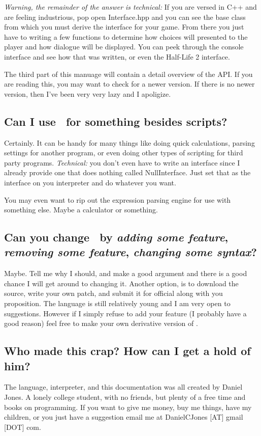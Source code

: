\emph{Warning, the remainder of the answer is technical:} If you are versed in C++ and are feeling industrious, pop open Interface.hpp and you can see the base class from which you must derive the interface for your game.   From there you just have to writing a few functions to determine how choices will presented to the player and how dialogue will be displayed.  You can peek through the console interface and see how that was written, or even the Half-Life 2 interface.

The third part of this manuage will contain a detail overview of the API.  If you are reading this, you may want to check for a newer version.  If there is no newer version, then I've been very very lazy and I apoligize.

\subsection{Can I use \SSquared\ for something besides scripts?}
Certainly.  It can be handy for many things like doing quick calculations, parsing settings for another program, or even doing other types of scripting for third party programs.  \emph{Technical:} you don't even have to write an interface since I already provide one that does nothing called NullInterface.  Just set that as the interface on you interpreter and do whatever you want.

You may even want to rip out the expression parsing engine for use with something else.  Maybe a calculator or something.

\subsection{Can you change \SSquared\ by \emph{adding some feature}, \emph{removing some feature}, \emph{changing some syntax}?}
Maybe.  Tell me why I should, and make a good argument and there is a good chance I will get around to changing it.  Another option, is to download the source, write your own patch, and submit it for official along with you proposition.  The language is still relatively young and I am very open to suggestions.  However if I simply refuse to add your feature (I probably have a good reason) feel free to make your own derivative version of \SSquared.

\subsection{Who made this crap?  How can I get a hold of him?}
The language, interpreter, and this documentation was all created by Daniel Jones.  A lonely college student, with no friends, but plenty of a free time and books on programming.  If you want to give me money, buy me things, have my children, or you just have a suggestion email me at DanielCJones [AT] gmail [DOT] com.

